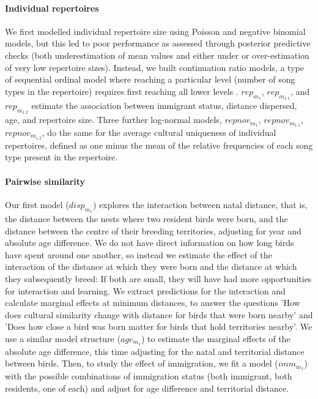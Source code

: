 \paragraph{Individual repertoires}
We first modelled individual repertoire size using Poisson and negative binomial models, but this led to poor performance as assessed through posterior predictive checks (both underestimation of mean values and either under or over-estimation of very low repertoire sizes). Instead, we built continuation ratio models, a type of sequential ordinal model where reaching a particular level (number of song types in the repertoire) requires first reaching all lower levels \autocite{chambers2023, warti2020}. $rep_{m_1}$, $rep_{m_{1.1}}$, and $rep_{m_{1.2}}$ estimate the association between immigrant status, distance dispersed, age, and repertoire size. Three further log-normal models, $repnov_{m_1}$, $repnov_{m_{1.1}}$, $repnov_{m_{1.2}}$, do the same for the average cultural uniqueness of individual repertoires, defined as one minus the mean of the relative frequencies of each song type present in the repertoire.

\paragraph{Pairwise similarity}
Our first model ($disp_{m_1}$) explores the interaction between natal distance, that is, the distance between the nests where two resident birds were born, and the distance between the centre of their breeding territories, adjusting for year and absolute age difference. We do not have direct information on how long birds have spent around one another, so instead we estimate the effect of the interaction of the distance at which they were born and the distance at which they subsequently breed: If both are small, they will have had more opportunities for interaction and learning. We extract predictions for the interaction and calculate marginal effects at minimum distances, to answer the questions 'How does cultural similarity change with distance for birds that were born nearby' and 'Does how close a bird was born matter for birds that hold territories nearby'. We use a similar model structure ($age_{m_1}$) to estimate the marginal effects of the absolute age difference, this time adjusting for the natal and territorial distance between birds. Then, to study the effect of immigration, we fit a model ($imm_{m_1}$) with the possible combinations of immigration status (both immigrant, both residents, one of each) and adjust for age difference and territorial distance. 

